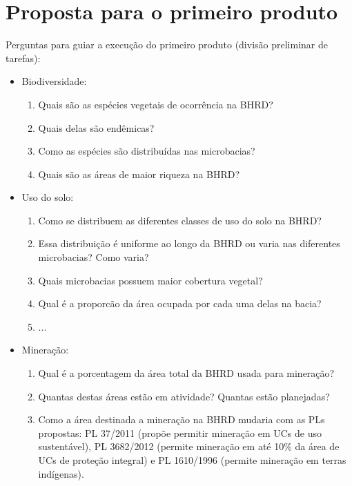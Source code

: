\documentclass{article}
\begin{document}
\section{Proposta para o primeiro produto}

Perguntas para guiar a execução do primeiro produto (divisão preliminar de tarefas):

\begin{itemize}
    \item Biodiversidade:
    \begin{enumerate}
        \item Quais são as espécies vegetais de ocorrência na BHRD? 
        \item Quais delas são endêmicas?
        \item Como as espécies são distribuídas nas microbacias? 
        \item Quais são as áreas de maior riqueza na BHRD?
    \end{enumerate}
    
    \item Uso do solo:
    \begin{enumerate}
        \item Como se distribuem as diferentes classes de uso do solo na BHRD? 
        \item Essa distribuição é uniforme ao longo da BHRD ou varia nas diferentes microbacias? Como varia?
        \item Quais microbacias possuem maior cobertura vegetal?
        \item Qual é a proporcão da área ocupada por cada uma delas na bacia?
        \item ...
    \end{enumerate}
    
    \item Mineração:
    \begin{enumerate}
        \item Qual é a porcentagem da área total da BHRD usada para mineração?
        \item Quantas destas áreas estão em atividade? Quantas estão planejadas?
        \item Como a área destinada a mineração na BHRD mudaria com as PLs propostas: PL 37/2011 (propõe permitir mineração em UCs de uso sustentável), PL 3682/2012 (permite mineração em até 10\% da área de UCs de proteção integral) e PL 1610/1996 (permite mineração em terras indígenas).
    \end{enumerate}
    

\end{itemize}
\end{document}
